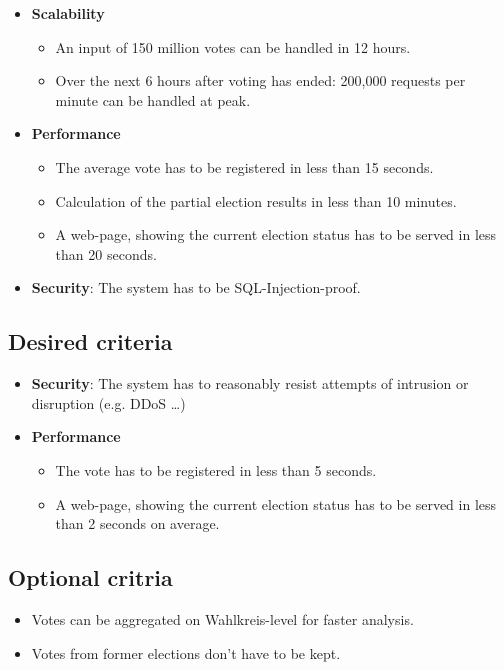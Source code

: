 \documentclass[10pt,a4paper]{article}
\begin{document}
\begin{itemize}
		\item \textbf{Scalability}
			\begin{itemize}
				\item An input of 150 million votes can be handled in 12 hours.
				\item Over the next 6 hours after voting has ended: 200,000 requests per minute can be handled at peak. 
			\end{itemize} 
			
		\item \textbf{Performance}
			\begin{itemize}
				\item The average vote has to be registered in less than 15 seconds.
				\item Calculation of the partial election results in less than 10 minutes.
				\item A web-page, showing the current election status has to be served in less than 20 seconds.
			\end{itemize}
			
		\item \textbf{Security}: The system has to be SQL-Injection-proof.
	\end{itemize}
\subsection{Desired criteria}
	\begin{itemize}
		\item \textbf{Security}: The system has to reasonably resist attempts of intrusion or disruption (e.g. DDoS \dots)
		
		\item \textbf{Performance}
			\begin{itemize}
				\item The vote has to be registered in less than 5 seconds.
				\item A web-page, showing the current election status has to be served in less than 2 seconds on average.
			\end{itemize}
	\end{itemize}
\subsection{Optional critria}
	\begin{itemize}
		\item Votes can be aggregated on Wahlkreis-level for faster analysis.
		\item Votes from former elections don't have to be kept.
	\end{itemize}
\end{document}
